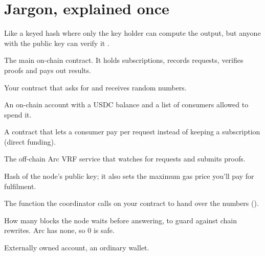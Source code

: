 \documentclass[11pt,a4paper]{article}
\begin{document}
\section{Jargon, explained once}
\begin{description}[leftmargin=1em,style=nextline]
  \item[VRF (Verifiable Random Function)] Like a keyed hash where only the key holder can compute the output, but anyone with the public key can verify it \cite{rfc9381}.
  \item[Coordinator] The main on-chain contract. It holds subscriptions, records requests, verifies proofs and pays out results.
  \item[Consumer] Your contract that asks for and receives random numbers.
  \item[Subscription] An on-chain account with a USDC balance and a list of consumers allowed to spend it.
  \item[Wrapper] A contract that lets a consumer pay per request instead of keeping a subscription (direct funding).
  \item[Node / oracle] The off-chain Arc VRF service that watches for requests and submits proofs.
  \item[keyHash / gas lane] Hash of the node's public key; it also sets the maximum gas price you'll pay for fulfilment.
  \item[Callback] The function the coordinator calls on your contract to hand over the numbers ().
  \item[Block confirmations] How many blocks the node waits before answering, to guard against chain rewrites. Arc has none, so 0 is safe.
  \item[EOA] Externally owned account, an ordinary wallet.
\end{description}

\end{document}
